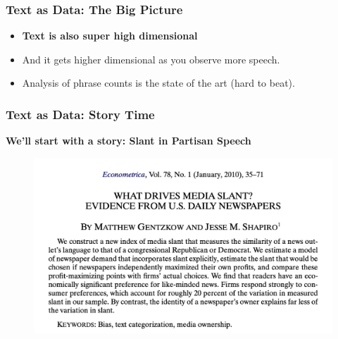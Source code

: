 \documentclass[
  shownotes,
  xcolor={svgnames},
  hyperref={colorlinks,citecolor=DarkBlue,linkcolor=DarkRed,urlcolor=DarkBlue}
  , aspectratio=169]{beamer}
\newcommand{\theme}{\color{andesred}}
\begin{document}
\begin{frame}[fragile]
\frametitle{Text as Data: The Big Picture}

\begin{itemize}

\item {\bf \theme Text is also super high dimensional }

\medskip
\item And it gets higher dimensional as you observe more speech.


\medskip
\item Analysis of  phrase counts is the state of the art (hard to beat).
\end{itemize}
\end{frame}
\begin{frame}[fragile]
\frametitle{Text as Data: Story Time}

{\bf We'll start with a story: \theme Slant in Partisan Speech}

  \begin{figure}[H] \centering
            \captionsetup{justification=centering}
              \includegraphics[scale=0.6]{figures/gentzgow_shapiro}
              
 \end{figure}

\end{frame}
\end{document}
